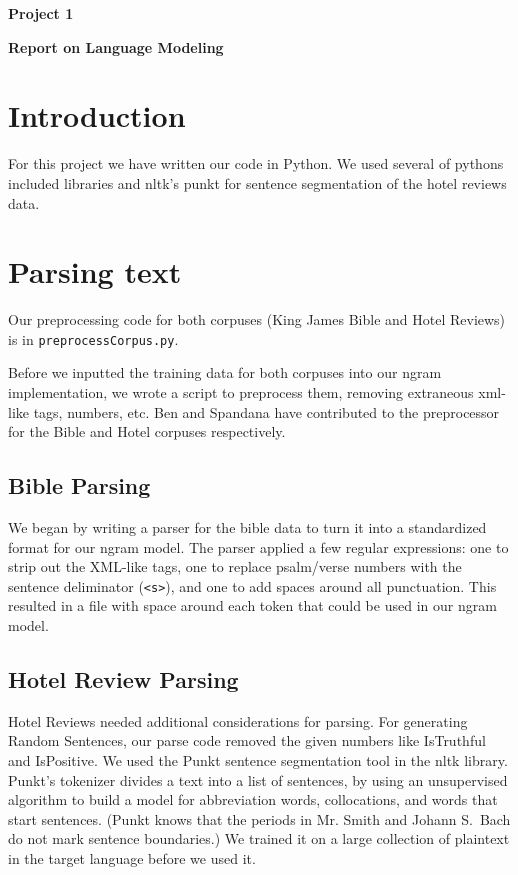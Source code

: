 \documentclass{article}
\begin{document}
\begin{center}\textbf{Project 1}\end{center}
\begin{center}\textbf{Report on Language Modeling}\end{center}

\section*{Introduction}

For this project we have written our code in Python. We used several of pythons included libraries and nltk's punkt for sentence segmentation of the hotel reviews data.

\section{Parsing text}
Our preprocessing code for both corpuses (King James Bible and Hotel Reviews) is in \texttt{preprocessCorpus.py}.\par

Before we inputted the training data for both corpuses into our ngram implementation, we wrote a script to preprocess them, removing extraneous xml-like tags, numbers, etc. Ben and Spandana have contributed to the preprocessor for the Bible and Hotel corpuses respectively.\par

\subsection{Bible Parsing}

We began by writing a parser for the bible data to turn it into a standardized format for our ngram model. The parser applied a few regular expressions: one to strip out the XML-like tags, one to replace psalm/verse numbers with the sentence deliminator (\texttt{<s>}), and one to add spaces around all punctuation. This resulted in a file with space around each token that could be used in our ngram model. 

\subsection{Hotel Review Parsing}

Hotel Reviews needed additional considerations for parsing. For generating Random Sentences, our parse code removed the given numbers like IsTruthful and IsPositive. We used the Punkt sentence segmentation tool in the nltk library. Punkt's tokenizer divides a text into a list of sentences, by using an unsupervised algorithm to build a model for abbreviation words, collocations, and words that start sentences. (Punkt knows that the periods in Mr. Smith and Johann S.\ Bach do not mark sentence boundaries.) We trained it on a large collection of plaintext in the target language before we used it.
\end{document}
